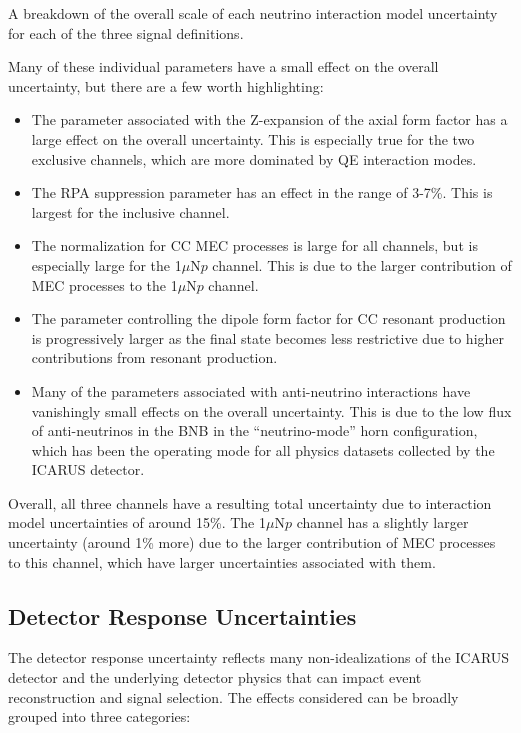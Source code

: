 \begin{table}
    \centering
    \caption{A breakdown of the overall scale of each neutrino interaction model uncertainty for each of the three signal definitions.}
    \resizebox{0.99\textwidth}{!}{}
    \label{tab:xsec}
\end{table}

Many of these individual parameters have a small effect on the overall uncertainty, but there are a few worth highlighting:

\begin{itemize}
    \item The parameter associated with the Z-expansion of the axial form factor has a large effect on the overall uncertainty. This is especially true for the two exclusive channels, which are more dominated by QE interaction modes.
    \item The RPA suppression parameter has an effect in the range of 3-7\%. This is largest for the inclusive channel.
    \item The normalization for CC MEC processes is large for all channels, but is especially large for the 1$\mu$N$p$ channel. This is due to the larger contribution of MEC processes to the 1$\mu$N$p$ channel.
    \item The parameter controlling the dipole form factor for CC resonant production is progressively larger as the final state becomes less restrictive due to higher contributions from resonant production.
    \item Many of the parameters associated with anti-neutrino interactions have vanishingly small effects on the overall uncertainty. This is due to the low flux of anti-neutrinos in the BNB in the ``neutrino-mode'' horn configuration, which has been the operating mode for all physics datasets collected by the ICARUS detector.
\end{itemize}

Overall, all three channels have a resulting total uncertainty due to interaction model uncertainties of around 15\%. The 1$\mu$N$p$ channel has a slightly larger uncertainty (around 1\% more) due to the larger contribution of MEC processes to this channel, which have larger uncertainties associated with them.

\subsection{Detector Response Uncertainties}
\label{sec:detector_response}
The detector response uncertainty reflects many non-idealizations of the ICARUS detector and the underlying detector physics that can impact event reconstruction and signal selection. The effects considered can be broadly grouped into three categories:

